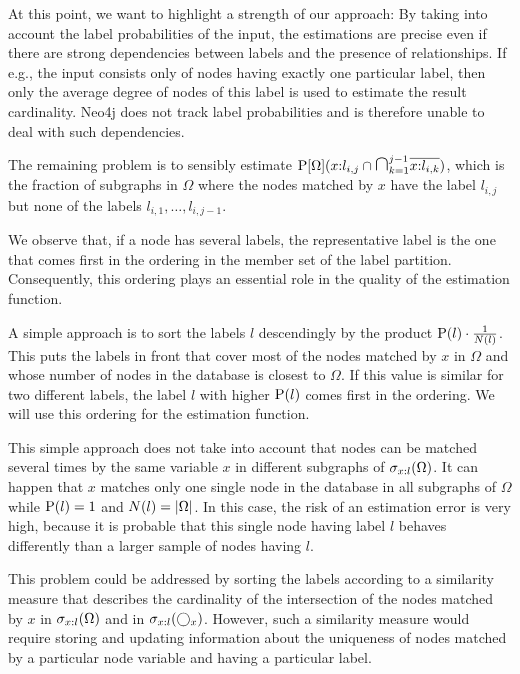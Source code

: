 At this point, we want to highlight a strength of our approach:
By taking into account the label probabilities of the input, the estimations
are precise even if there are strong dependencies between labels and the
presence of relationships.
If e.g., the input consists only of nodes having exactly one particular label,
then only the average degree of nodes of this label is used to estimate the
result cardinality.
Neo4j does not track label probabilities and is therefore unable to deal with
such dependencies.

The remaining problem is to sensibly estimate
$\prob{\Omega}(x{:}l_{i,j} \isect
               \bigisect_{k=1}^{j-1} \overline{x{:}l_{i,k}})$, which is the
fraction of subgraphs in $\Omega$ where the nodes matched by $x$ have the label
$l_{i,j}$ but none of the labels $l_{i,1}, \ldots, l_{i,j-1}$.

We observe that, if a node has several labels, the representative label is the
one that comes first in the ordering in the member set of the label partition.
Consequently, this ordering plays an essential role in the quality of the
estimation function.

A simple approach is to sort the labels $l$ descendingly by the product
$\operatorname{P}(l) \cdot \frac{1}{N(l)}$. This puts the labels in front that cover
most of the nodes matched by $x$ in $\Omega$ and whose number
of nodes in the database is closest to $\Omega$. If this value is similar for
two different labels, the label $l$ with higher $\operatorname{P}(l)$ comes first in the
ordering.
We will use this ordering for the estimation function.

\begin{remark}
This simple approach does not take into account that nodes can be
matched several times by the same variable $x$ in different subgraphs of
$\sigma_{x:l}(\Omega)$.
It can happen that $x$ matches only one single node in the database in all
subgraphs of $\Omega$ while $\operatorname{P}(l) = 1$ and $N(l) = {\left \vert \Omega \right \vert}$.
In this case, the risk of an estimation error is very high, because it is
probable that this single node having label $l$ behaves differently than
a larger sample of nodes having $l$.

This problem could be addressed by sorting the labels according to a similarity
measure that describes the cardinality of the intersection of the nodes
matched by $x$ in $\sigma_{x:l}(\Omega)$ and in
$\sigma_{x:l}(\bigcirc_{x})$.
However, such a similarity measure would require storing and updating
information about the uniqueness of nodes matched by a particular node variable
and having a particular label.
\end{remark}

